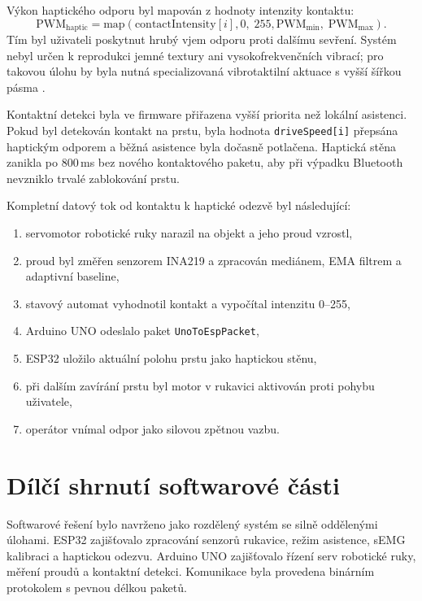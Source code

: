 Výkon haptického odporu byl mapován z hodnoty intenzity kontaktu:
\begin{equation}
    \mathrm{PWM}_{\mathrm{haptic}} =
    \mathrm{map}\left(
        \mathrm{contactIntensity}[i],
        0,\;255,
        \mathrm{PWM}_{\min},\;\mathrm{PWM}_{\max}
    \right).
\end{equation}
Tím byl uživateli poskytnut hrubý vjem odporu proti dalšímu sevření. Systém nebyl určen k reprodukci jemné textury ani vysokofrekvenčních vibrací; pro takovou úlohu by byla nutná specializovaná vibrotaktilní aktuace s vyšší šířkou pásma \cite{Fang2022}.

Kontaktní detekci byla ve firmware přiřazena vyšší priorita než lokální asistenci. Pokud byl detekován kontakt na prstu, byla hodnota \texttt{driveSpeed[i]} přepsána haptickým odporem a běžná asistence byla dočasně potlačena. Haptická stěna zanikla po 800\,ms bez nového kontaktového paketu, aby při výpadku Bluetooth nevzniklo trvalé zablokování prstu.

Kompletní datový tok od kontaktu k haptické odezvě byl následující:

\begin{enumerate}
    \item servomotor robotické ruky narazil na objekt a jeho proud vzrostl,
    \item proud byl změřen senzorem INA219 a zpracován mediánem, EMA filtrem a adaptivní baseline,
    \item stavový automat vyhodnotil kontakt a vypočítal intenzitu 0--255,
    \item Arduino UNO odeslalo paket \texttt{UnoToEspPacket},
    \item ESP32 uložilo aktuální polohu prstu jako haptickou stěnu,
    \item při dalším zavírání prstu byl motor v rukavici aktivován proti pohybu uživatele,
    \item operátor vnímal odpor jako silovou zpětnou vazbu.
\end{enumerate}

\section{Dílčí shrnutí softwarové části}
\label{sec:shrnuti-software}

Softwarové řešení bylo navrženo jako rozdělený systém se silně oddělenými úlohami. ESP32 zajišťovalo zpracování senzorů rukavice, režim asistence, sEMG kalibraci a haptickou odezvu. Arduino UNO zajišťovalo řízení serv robotické ruky, měření proudů a kontaktní detekci. Komunikace byla provedena binárním protokolem s pevnou délkou paketů.

